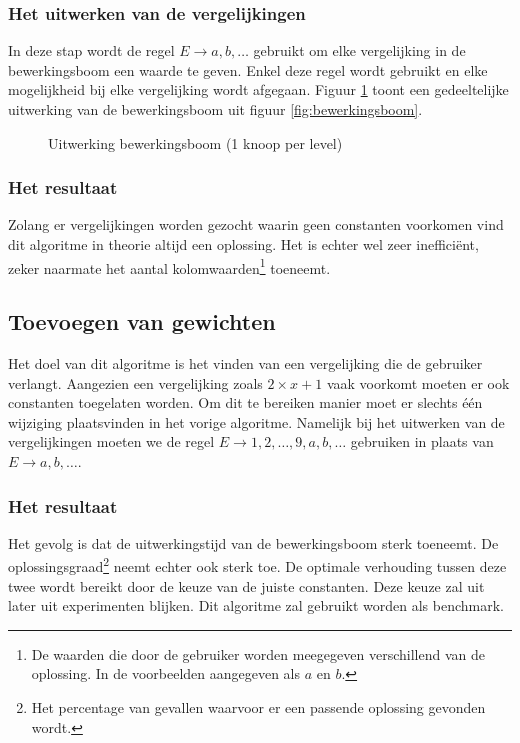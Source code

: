 \documentclass[Main.tex]{subfiles}
\begin{document}
\subsubsection*{Het uitwerken van de vergelijkingen}
In deze stap wordt de regel $E \rightarrow a,b,\dotsc$ gebruikt om elke vergelijking in de bewerkingsboom een waarde te geven. Enkel deze regel wordt gebruikt en elke mogelijkheid bij elke vergelijking wordt afgegaan. Figuur \ref{fig:uitwerkingsboom} toont een gedeeltelijke uitwerking van de bewerkingsboom uit figuur \ref{fig:bewerkingsboom}.
\begin{figure}[!htb]
\centering
{}
\caption{Uitwerking bewerkingsboom (1 knoop per level)} \label{fig:uitwerkingsboom}
\end{figure}
\subsubsection*{Het resultaat}
Zolang er vergelijkingen worden gezocht waarin geen constanten voorkomen vind dit algoritme in theorie altijd een oplossing. Het is echter wel zeer inefficiënt, zeker naarmate het aantal kolomwaarden\footnote{\label{note:kolomwaarden}De waarden die door de gebruiker worden meegegeven verschillend van de oplossing. In de voorbeelden aangegeven als $a$ en $b$.}
toeneemt.
\subsection{Toevoegen van gewichten}
Het doel van dit algoritme is het vinden van een vergelijking die de gebruiker verlangt. Aangezien een vergelijking zoals $2 \times x+1$ vaak voorkomt moeten er ook constanten toegelaten worden. Om dit te bereiken manier moet er slechts één wijziging plaatsvinden in het vorige algoritme. Namelijk bij het uitwerken van de vergelijkingen moeten we de regel $E \rightarrow 1,2,\dotsc,9,a,b,\dotsc$ gebruiken in plaats van $E \rightarrow a,b,\dotsc$.
\subsubsection*{Het resultaat}
Het gevolg is dat de uitwerkingstijd van de bewerkingsboom sterk toeneemt. De oplossingsgraad\footnote{\label{note:oplossingsgraad}Het percentage van gevallen waarvoor er een passende oplossing gevonden wordt.}
neemt echter ook sterk toe. De optimale verhouding tussen deze twee wordt bereikt door de keuze van de juiste constanten. Deze keuze zal uit later uit experimenten blijken. Dit algoritme zal gebruikt worden als benchmark.
\end{document}
